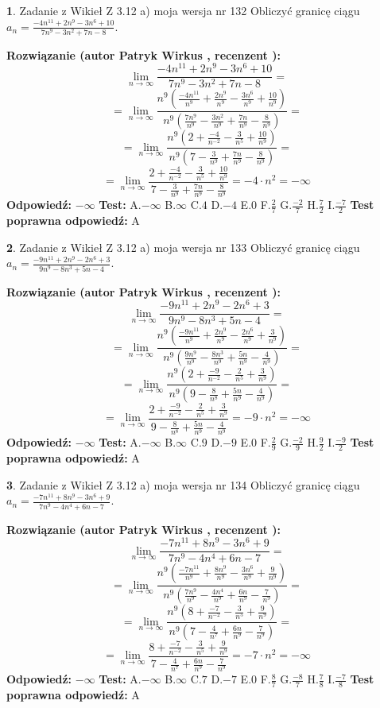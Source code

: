 \documentclass[12pt, a4paper]{article}
\theoremstyle{definition} %
\newtheorem{zad}{}
\newcommand{\zadStart}[1]{\begin{zad}#1\newline}
\newcommand{\zadStop}{\end{zad}}
\newcommand{\rozwStart}[2]{\noindent \textbf{Rozwiązanie (autor #1 , recenzent #2): }\newline}
\newcommand{\rozwStop}{\newline}
\newcommand{\odpStart}{\noindent \textbf{Odpowiedź:}\newline}
\newcommand{\odpStop}{\newline}
\newcommand{\testStart}{\noindent \textbf{Test:}\newline}
\newcommand{\testStop}{\newline}
\newcommand{\kluczStart}{\noindent \textbf{Test poprawna odpowiedź:}\newline}
\newcommand{\kluczStop}{\newline}
\begin{document}
\zadStart{Zadanie z Wikieł Z 3.12 a) moja wersja nr 132}
Obliczyć granicę ciągu $a_{n}=\frac{-4n^{11}+2n^{9}-3n^{6}+10}{7n^{9}-3n^{2}+7n-8}$.
\zadStop
\rozwStart{Patryk Wirkus}{}
$$\lim\limits_{n\to\infty}\frac{-4n^{11}+2n^{9}-3n^{6}+10}{7n^{9}-3n^{2}+7n-8}=$$
$$=\lim\limits_{n\to\infty}\frac{n^{9}\left(\frac{-4n^{11}}{n^{9}}+\frac{2n^{9}}{n^{9}}-\frac{3n^{6}}{n^{9}}+\frac{10}{n^{9}}\right)}{n^{9}\left(\frac{7n^{9}}{n^{9}}-\frac{3n^{2}}{n^{9}}+\frac{7n}{n^{9}}-\frac{8}{n^{9}}\right)}=$$
$$=\lim\limits_{n\to\infty}\frac{n^{9}\left(2+\frac{-4}{n^{-2}}-\frac{3}{n^{5}}+\frac{10}{n^{9}}\right)}
{n^{9}\left(7-\frac{3}{n^{9}}+\frac{7n}{n^{9}}-\frac{8}{n^{9}}\right)}=$$
$$=\lim\limits_{n\to\infty}\frac{2+\frac{-4}{n^{-2}}-\frac{3}{n^{5}}+\frac{10}{n^{9}}}{7-\frac{3}{n^{9}}+\frac{7n}{n^{9}}-\frac{8}{n^{9}}}=-4\cdot n^{2} = -\infty$$
\rozwStop
\odpStart
$-\infty$
\odpStop
\testStart
A.$-\infty$
B.$\infty$
C.$4$
D.$-4$
E.$0$
F.$\frac{2}{7}$
G.$\frac{-2}{7}$
H.$\frac{7}{2}$
I.$\frac{-7}{2}$
\testStop
\kluczStart
A
\kluczStop



\zadStart{Zadanie z Wikieł Z 3.12 a) moja wersja nr 133}
Obliczyć granicę ciągu $a_{n}=\frac{-9n^{11}+2n^{9}-2n^{6}+3}{9n^{9}-8n^{3}+5n-4}$.
\zadStop
\rozwStart{Patryk Wirkus}{}
$$\lim\limits_{n\to\infty}\frac{-9n^{11}+2n^{9}-2n^{6}+3}{9n^{9}-8n^{3}+5n-4}=$$
$$=\lim\limits_{n\to\infty}\frac{n^{9}\left(\frac{-9n^{11}}{n^{9}}+\frac{2n^{9}}{n^{9}}-\frac{2n^{6}}{n^{9}}+\frac{3}{n^{9}}\right)}{n^{9}\left(\frac{9n^{9}}{n^{9}}-\frac{8n^{3}}{n^{9}}+\frac{5n}{n^{9}}-\frac{4}{n^{9}}\right)}=$$
$$=\lim\limits_{n\to\infty}\frac{n^{9}\left(2+\frac{-9}{n^{-2}}-\frac{2}{n^{5}}+\frac{3}{n^{9}}\right)}
{n^{9}\left(9-\frac{8}{n^{8}}+\frac{5n}{n^{9}}-\frac{4}{n^{9}}\right)}=$$
$$=\lim\limits_{n\to\infty}\frac{2+\frac{-9}{n^{-2}}-\frac{2}{n^{5}}+\frac{3}{n^{9}}}{9-\frac{8}{n^{8}}+\frac{5n}{n^{9}}-\frac{4}{n^{9}}}=-9\cdot n^{2} = -\infty$$
\rozwStop
\odpStart
$-\infty$
\odpStop
\testStart
A.$-\infty$
B.$\infty$
C.$9$
D.$-9$
E.$0$
F.$\frac{2}{9}$
G.$\frac{-2}{9}$
H.$\frac{9}{2}$
I.$\frac{-9}{2}$
\testStop
\kluczStart
A
\kluczStop



\zadStart{Zadanie z Wikieł Z 3.12 a) moja wersja nr 134}
Obliczyć granicę ciągu $a_{n}=\frac{-7n^{11}+8n^{9}-3n^{6}+9}{7n^{9}-4n^{4}+6n-7}$.
\zadStop
\rozwStart{Patryk Wirkus}{}
$$\lim\limits_{n\to\infty}\frac{-7n^{11}+8n^{9}-3n^{6}+9}{7n^{9}-4n^{4}+6n-7}=$$
$$=\lim\limits_{n\to\infty}\frac{n^{9}\left(\frac{-7n^{11}}{n^{9}}+\frac{8n^{9}}{n^{9}}-\frac{3n^{6}}{n^{9}}+\frac{9}{n^{9}}\right)}{n^{9}\left(\frac{7n^{9}}{n^{9}}-\frac{4n^{4}}{n^{9}}+\frac{6n}{n^{9}}-\frac{7}{n^{9}}\right)}=$$
$$=\lim\limits_{n\to\infty}\frac{n^{9}\left(8+\frac{-7}{n^{-2}}-\frac{3}{n^{5}}+\frac{9}{n^{9}}\right)}
{n^{9}\left(7-\frac{4}{n^{7}}+\frac{6n}{n^{9}}-\frac{7}{n^{9}}\right)}=$$
$$=\lim\limits_{n\to\infty}\frac{8+\frac{-7}{n^{-2}}-\frac{3}{n^{5}}+\frac{9}{n^{9}}}{7-\frac{4}{n^{7}}+\frac{6n}{n^{9}}-\frac{7}{n^{9}}}=-7\cdot n^{2} = -\infty$$
\rozwStop
\odpStart
$-\infty$
\odpStop
\testStart
A.$-\infty$
B.$\infty$
C.$7$
D.$-7$
E.$0$
F.$\frac{8}{7}$
G.$\frac{-8}{7}$
H.$\frac{7}{8}$
I.$\frac{-7}{8}$
\testStop
\kluczStart
A
\kluczStop
\end{document}
